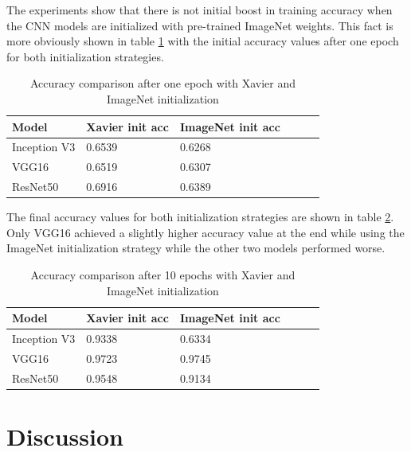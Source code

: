 \documentclass{article}
\theoremstyle{definition}
\theoremstyle{remark}
\begin{document}
The experiments show that there is not initial boost in training accuracy when the CNN models are initialized with pre-trained ImageNet weights. This fact is more obviously shown in table \ref{tab:one_epoch_xavier_vs_imagenet} with the initial accuracy values after one epoch for both initialization strategies.


\begin{table}[h!]
\center
\begin{tabular}{|l|l|l|l|l|l|}
\hline
\textbf{Model} & \textbf{Xavier init acc} & \textbf{ImageNet init acc}\\ \hline
 Inception V3	& 0.6539  & 0.6268\\ \hline
 VGG16  		& 0.6519  	 	 &  0.6307	  	\\ \hline     
 ResNet50  	& 0.6916  	  	 & 0.6389\\ \hline
\end{tabular}
\caption{Accuracy comparison after one epoch with Xavier and ImageNet initialization}
\label{tab:one_epoch_xavier_vs_imagenet}
\end{table}


The final accuracy values for both initialization strategies are shown in table \ref{tab:10_epochs_xavier_vs_imagenet}. Only VGG16 achieved a slightly higher accuracy value at the end while using the ImageNet initialization strategy while the other two models performed worse.

\begin{table}[h!]
\center
\begin{tabular}{|l|l|l|l|l|l|}
\hline
\textbf{Model} & \textbf{Xavier init acc} & \textbf{ImageNet init acc}\\ \hline
 Inception V3	& 0.9338  & 0.6334\\ \hline
 VGG16  		& 0.9723  	 	 &  0.9745	  	\\ \hline     
 ResNet50  	&  0.9548 	  	 & 0.9134 \\ \hline
\end{tabular}
\caption{Accuracy comparison after 10 epochs with Xavier and ImageNet initialization}
\label{tab:10_epochs_xavier_vs_imagenet}
\end{table}



\newpage




\section{Discussion}
\end{document}
